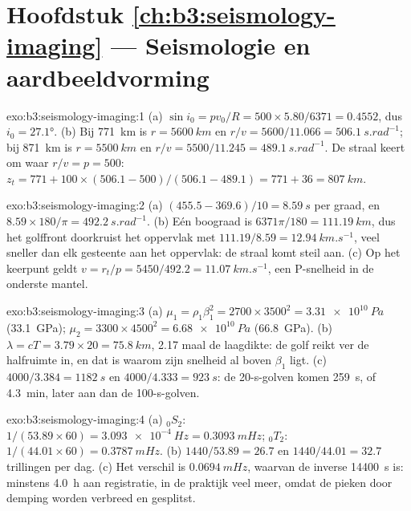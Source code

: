 \section*{Hoofdstuk \ref{ch:b3:seismology-imaging} --- Seismologie en aardbeeldvorming}

\begin{solution}{exo:b3:seismology-imaging:1}
(a) $\sin i_0 = pv_0/R = 500\times5.80/6371 = 0.4552$, dus $i_0 = \ang{27.1}$.
(b) Bij \qty{771}{km} is $r = \qty{5600}{km}$ en $r/v = 5600/11.066 =
\qty{506.1}{s.rad^{-1}}$; bij \qty{871}{km} is $r = \qty{5500}{km}$ en $r/v =
5500/11.245 = \qty{489.1}{s.rad^{-1}}$. De straal keert om waar $r/v = p = 500$:
$z_t = 771 + 100\times(506.1 - 500)/(506.1 - 489.1) = 771 + 36 =
\qty{807}{km}$.
\end{solution}

\begin{solution}{exo:b3:seismology-imaging:2}
(a) $(455.5 - 369.6)/10 = \qty{8.59}{s}$ per graad, en
$8.59\times180/\pi = \qty{492.2}{s.rad^{-1}}$. (b) Eén boograad is
$6371\pi/180 = \qty{111.19}{km}$, dus het golffront doorkruist het oppervlak met
$111.19/8.59 = \qty{12.94}{km.s^{-1}}$, veel sneller dan elk gesteente aan het
oppervlak: de straal komt steil aan. (c) Op het keerpunt geldt $v = r_t/p =
5450/492.2 = \qty{11.07}{km.s^{-1}}$, een P-snelheid in de onderste mantel.
\end{solution}

\begin{solution}{exo:b3:seismology-imaging:3}
(a) $\mu_1 = \rho_1\beta_1^2 = 2700\times3500^2 = \qty{3.31e10}{Pa}$
(\qty{33.1}{GPa}); $\mu_2 = 3300\times4500^2 = \qty{6.68e10}{Pa}$
(\qty{66.8}{GPa}). (b) $\lambda = cT = 3.79\times20 = \qty{75.8}{km}$, 2.17
maal de laagdikte: de golf reikt ver de halfruimte in, en dat is
waarom zijn snelheid al boven $\beta_1$ ligt. (c) $4000/3.384 = \qty{1182}{s}$ en
$4000/4.333 = \qty{923}{s}$: de 20-s-golven komen \qty{259}{s}, of
\qty{4.3}{min}, later aan dan de 100-s-golven.
\end{solution}

\begin{solution}{exo:b3:seismology-imaging:4}
(a) ${}_0S_2$: $1/(53.89\times60) = \qty{3.093e-4}{Hz} = \qty{0.3093}{mHz}$;
${}_0T_2$: $1/(44.01\times60) = \qty{0.3787}{mHz}$. (b) $1440/53.89 = 26.7$
en $1440/44.01 = 32.7$ trillingen per dag. (c) Het verschil is
$\qty{0.0694}{mHz}$, waarvan de inverse \qty{14400}{s} is: minstens \qty{4.0}{h} aan
registratie, in de praktijk veel meer, omdat de pieken door demping worden verbreed en
gesplitst.
\end{solution}

